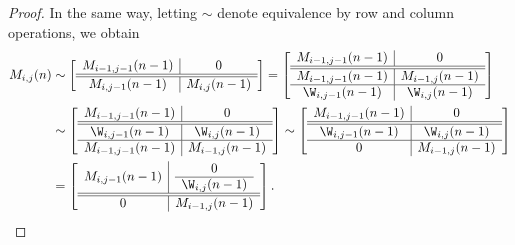\begin{proof}
In the same way, letting $\sim$ denote equivalence by row and column operations, we obtain 
\begin{align*}
M_{i,j}(n) &\sim \left [ \begin{array}{c|c}
M_{i-1,j-1}(n-1) & 0 \\
\hline
\hline
M_{i,j-1}(n-1) & M_{i,j}(n-1)
\end{array} \right ] 
= \left [ \begin{array}{c|c}
M_{i-1,j-1}(n-1) & 0\\
\hline
\hline
M_{i-1,j-1}(n-1) & M_{i-1,j}(n-1)\\
\hline
\W_{i,j-1}(n-1) & \W_{i,j}(n-1) 
\end{array} \right ] \\
&\sim \left [ \begin{array}{c|c}
M_{i-1,j-1}(n-1) & 0\\
\hline
\hline
\W_{i,j-1}(n-1) & \W_{i,j}(n-1) \\
\hline
M_{i-1,j-1}(n-1) & M_{i-1,j}(n-1)
\end{array} \right ] 
\sim \left [ \begin{array}{c|c}
M_{i-1,j-1}(n-1) & 0\\
\hline
\hline
\W_{i,j-1}(n-1) & \W_{i,j}(n-1) \\
\hline
0 & M_{i-1,j}(n-1)
\end{array} \right ] \\
&= \left [ \begin{array}{c|c}
M_{i,j-1}(n-1) & 
\begin{array}{c}
0 \\
\hline
\W_{i,j}(n-1) \end{array}
\\
\hline
\hline
0 & M_{i-1,j}(n-1)
\end{array} \right ].
\end{align*}


\end{proof}
